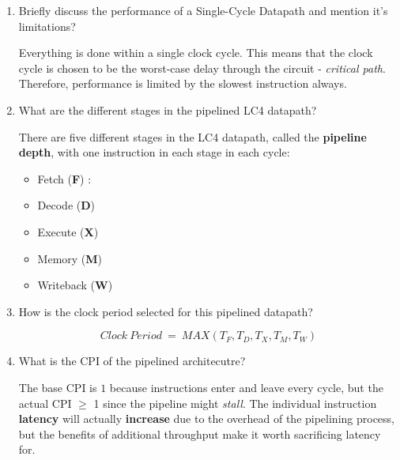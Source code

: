 \documentclass[12pt]{article}
\newenvironment{QandA}{\begin{enumerate}[label=\bfseries\arabic*.]\bfseries}
                      {\end{enumerate}}
\newenvironment{answered}{\par\quad\normalfont}{}
\begin{document}
\begin{QandA}
\begin{answered}
    Here $\frac{Instruction}{Program}$ refers to the \textbf{Dynamic Instruction Count}. It is the instructions that the processor will actually run during the course of a program and not just the static instructions (eg: loops).
    \end{answered}
    
    \item Briefly discuss the performance of a Single-Cycle Datapath and mention it's limitations?
    \begin{answered}
    Everything is done within a single clock cycle. This means that the clock cycle is chosen to be the worst-case delay through the circuit - \textit{critical path}. Therefore, performance is limited by the slowest instruction always.
    \end{answered}
        
    \item What are the different stages in the pipelined LC4 datapath?
    \begin{answered}
    There are five different stages in the LC4 datapath, called the \textbf{pipeline depth}, with one instruction in each stage in each cycle:
    \begin{itemize}
        \item Fetch (\textbf{F}) : 
        \item Decode (\textbf{D})
        \item Execute (\textbf{X})
        \item Memory (\textbf{M})
        \item Writeback (\textbf{W})
    \end{itemize}
    \end{answered}
    
    \item How is the clock period selected for this pipelined datapath?
    \begin{answered}
    \begin{equation*}
        Clock\ Period\ =\ MAX(T_{F}, T_{D}, T_{X}, T_{M}, T_{W})
    \end{equation*}    
    \end{answered}
    
    \item What is the CPI of the pipelined architecutre?
    \begin{answered}
    The base CPI is $1$ because instructions enter and leave every cycle, but the actual CPI $\geq$ 1 since the pipeline might \textit{stall}. The individual instruction \textbf{latency} will actually \textbf{increase} due to the overhead of the pipelining process, but the benefits of additional throughput make it worth sacrificing latency for.
    \end{answered}
    

\end{QandA}
\end{document}
